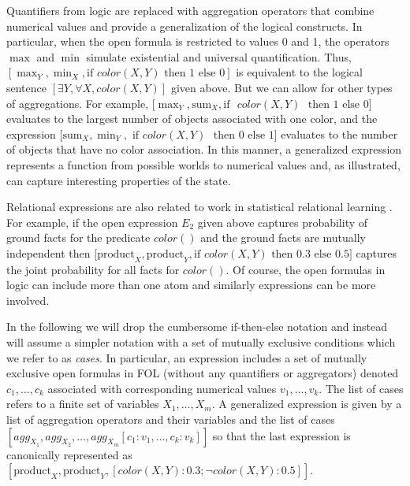 Quantifiers from logic are replaced with aggregation operators that
combine numerical values and provide a generalization of the logical
constructs. In particular, when the open formula is restricted to
values 0 and 1, the operators $\max$ and $\min$ simulate existential
and universal quantification.  Thus, $[\max_{Y}, \min_{X}, \mbox{if }
  color(X,Y) \mbox{ then 1 else 0}]$ is equivalent to the logical
sentence $[\exists Y, \forall X, color(X,Y)]$ given above.  But we can
allow for other types of aggregations. For example, $[\max_{Y},
  \mbox{sum}_{X}, \mbox{if }$ $color(X,Y)$ $\mbox{ then 1 else 0}]$
evaluates to the largest number of objects associated with one color,
and the expression $[\mbox{sum}_{X}, \min_{Y},$ $\mbox{if }
  color(X,Y)$ $\mbox{ then 0 else 1}]$ evaluates to the number of
objects that have no color association.
In this
manner, a generalized expression represents a function from possible
worlds to numerical values and, as illustrated, can capture interesting properties of the state.

Relational expressions are also related to work in statistical
relational learning \cite{RichardsonDo06,Problog,LiftedWMC}.  For example, if the
open expression $E_2$ given above captures probability of ground facts for the
predicate $color()$ and the ground facts are mutually independent then
$[\mbox{product}_{X}, \mbox{product}_{Y}, \mbox{if } color(X,Y)$ $\mbox{
    then 0.3 else 0.5}]$ captures the joint probability for all facts
for $color()$. Of course, the open formulas in logic can include more
than one atom and similarly expressions can be more involved. 

%
%
%
In the following we will drop the cumbersome if-then-else notation and
instead will assume a simpler notation with a set of mutually exclusive conditions which we refer to as {\em cases}.  In particular, an
expression includes a set of mutually exclusive open formulas in FOL
(without any quantifiers or aggregators) 
denoted $c_1,\ldots,c_k$ associated with corresponding numerical values
$v_1,\ldots,v_k$.  The list of cases refers to a finite set of
variables $X_1,\ldots,X_m$. A generalized expression is given by a
list of aggregation operators and their variables and the list of
cases $[agg_{X_1}, agg_{X_2}, \ldots , agg_{X_m}
  [c_1:v_1,\ldots,c_k:v_k]]$ so that the last expression is
canonically represented as $[\mbox{product}_{X}, \mbox{product}_{Y},
    [color(X,Y):0.3; \neg color(X,Y):0.5]]$.

